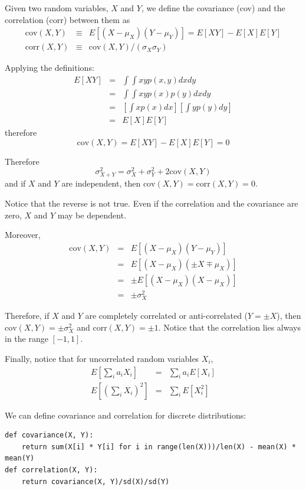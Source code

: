 \documentclass[justified, sixbynine]{tufte-book}
\def\ft{\small\tt}
\theoremstyle{plain}%
\newtheorem * {corollary}{Corollary}
\theoremstyle{definition}
\theoremstyle{remark}
\newtheorem * {remark}{Remark}
\newtheorem * {note}{Note}
\begin{document}
\begin{fullwidth}
Given two random variables, $X$ and $Y$, we define the covariance (cov)  and the correlation (corr)
between
them as
\begin{eqnarray}
\textrm{cov}(X, Y) &\equiv  &E[(X-\mu _X)(Y-\mu _Y)]=E[XY]-E[X]E[Y] \\
\textrm{corr}(X, Y) &\equiv & \textrm{cov}(X, Y)/(\sigma_X \sigma_Y)
\end{eqnarray}

Applying the definitions:
\begin{eqnarray}
E[XY] &=&\int \int xyp(x, y)dxdy \\
&=&\int \int xyp(x)p(y)dxdy \\
&=&\left[ \int xp(x)dx\right] \left[ \int yp(y)dy\right] \\
&=&E[X]E[Y]
\end{eqnarray}
therefore
\begin{equation}
\textrm{cov}(X, Y) =E[XY]-E[X]E[Y]=0
\end{equation}

Therefore
\begin{equation}
\sigma _{X+Y}^2=\sigma _X^2+\sigma _Y^2+2 \textrm{cov}(X, Y)
\end{equation}
and if $X$ and $Y$ are independent, then $\textrm{cov}(X, Y)=\textrm{corr}(X, Y)=0$.

Notice that the reverse is not true. Even if the correlation and the covariance are zero, $X$ and $Y$ may be dependent.

Moreover, 
\begin{eqnarray}
\textrm{cov}(X, Y) &=&E[(X-\mu _X)(Y-\mu _Y)] \\
&=&E[(X-\mu _X)(\pm X\mp \mu _X)] \\
&=&\pm E[(X-\mu _X)(X-\mu _X)] \\
&=&\pm \sigma _X^2
\end{eqnarray}

Therefore, if $X$ and $Y$ are completely correlated or anti-correlated ($Y=\pm X$), then $\textrm{cov}(X, Y)=\pm \sigma _X^2$ and $\textrm{corr}(X, Y) = \pm 1$.
Notice that the correlation lies always in the range $[-1, 1]$.

Finally, notice that for uncorrelated random variables $X_i$, 
\begin{eqnarray}
E[\sum_ia_iX_i] &=&\sum_ia_iE[X_i] \\
E[(\sum_iX_i)^2] &=&\sum_iE[X_i^2]
\end{eqnarray}


We can define covariance and correlation for discrete distributions:
\begin{lstlisting}[caption={in file: {\ft nlib.py}}]
def covariance(X, Y):
    return sum(X[i] * Y[i] for i in range(len(X)))/len(X) - mean(X) * mean(Y)
def correlation(X, Y):
    return covariance(X, Y)/sd(X)/sd(Y)
\end{lstlisting}


\end{fullwidth}
\end{document}
